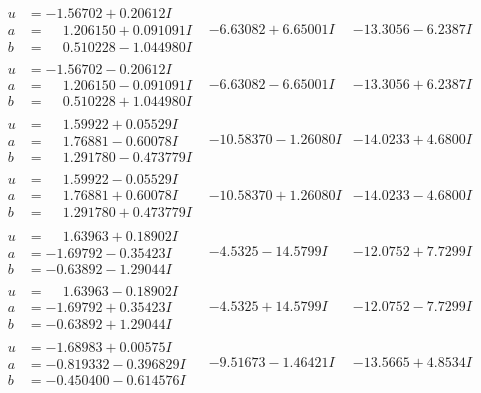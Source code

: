 \documentclass[1p]{elsarticle_modified}
\theoremstyle{definition}
\begin{document}
$$\begin{array}{c|c|c}
\begin{aligned}
u &= -1.56702 + 0.20612 I \\
a &= \phantom{-}1.206150 + 0.091091 I \\
b &= \phantom{-}0.510228 - 1.044980 I\end{aligned}
 & -6.63082 + 6.65001 I & -13.3056 - 6.2387 I \\ \hline\begin{aligned}
u &= -1.56702 - 0.20612 I \\
a &= \phantom{-}1.206150 - 0.091091 I \\
b &= \phantom{-}0.510228 + 1.044980 I\end{aligned}
 & -6.63082 - 6.65001 I & -13.3056 + 6.2387 I \\ \hline\begin{aligned}
u &= \phantom{-}1.59922 + 0.05529 I \\
a &= \phantom{-}1.76881 - 0.60078 I \\
b &= \phantom{-}1.291780 - 0.473779 I\end{aligned}
 & -10.58370 - 1.26080 I & -14.0233 + 4.6800 I \\ \hline\begin{aligned}
u &= \phantom{-}1.59922 - 0.05529 I \\
a &= \phantom{-}1.76881 + 0.60078 I \\
b &= \phantom{-}1.291780 + 0.473779 I\end{aligned}
 & -10.58370 + 1.26080 I & -14.0233 - 4.6800 I \\ \hline\begin{aligned}
u &= \phantom{-}1.63963 + 0.18902 I \\
a &= -1.69792 - 0.35423 I \\
b &= -0.63892 - 1.29044 I\end{aligned}
 & -4.5325 - 14.5799 I & -12.0752 + 7.7299 I \\ \hline\begin{aligned}
u &= \phantom{-}1.63963 - 0.18902 I \\
a &= -1.69792 + 0.35423 I \\
b &= -0.63892 + 1.29044 I\end{aligned}
 & -4.5325 + 14.5799 I & -12.0752 - 7.7299 I \\ \hline\begin{aligned}
u &= -1.68983 + 0.00575 I \\
a &= -0.819332 - 0.396829 I \\
b &= -0.450400 - 0.614576 I\end{aligned}
 & -9.51673 - 1.46421 I & -13.5665 + 4.8534 I \\ \hline\begin{aligned}

\end{aligned}
\end{array}$$
\end{document}
